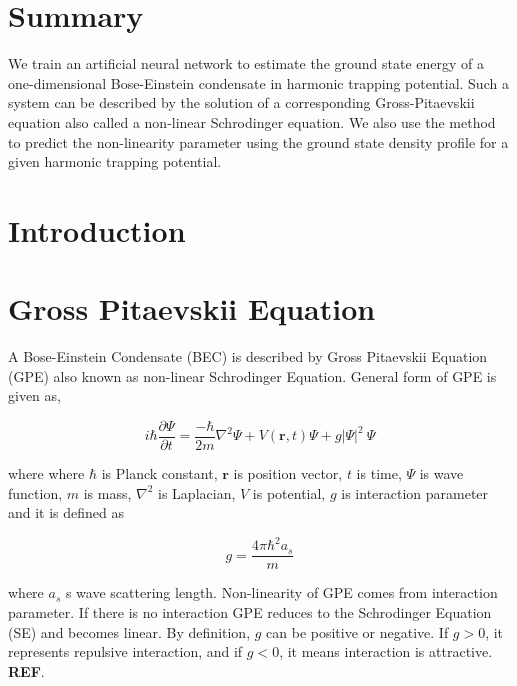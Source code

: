 \documentclass[a4paper,times,12pt]{article}
\begin{document}
\setcounter{page}{1}

\section*{Summary}

We train an artificial neural network to estimate the ground state energy
of a one-dimensional Bose-Einstein condensate in harmonic trapping potential.
Such a system can be described by the solution of a corresponding
Gross-Pitaevskii equation also called a non-linear Schrodinger equation.
We also use the method to predict the non-linearity parameter using the ground
state density profile for a given harmonic trapping potential.


\section{Introduction}
\section{Gross Pitaevskii Equation}

A Bose-Einstein Condensate (BEC) is described by Gross Pitaevskii Equation (GPE) also known as non-linear Schrodinger Equation. General form of GPE is given as,

\begin{equation}
\label{eq:GPE_3D}
i \hbar \frac {\partial \Psi}{\partial t} = \frac {-\hbar}{2m}\nabla^2
\Psi + V(\boldsymbol{r}, t)\Psi + g|\Psi|^2\ \Psi
\end{equation}


where %
where $\hbar$ is Planck constant, $\boldsymbol{r}$ is position vector, $t$ is time, $\Psi$ is wave function, $m$ is mass, $\nabla^2$ is Laplacian, $V$ is potential, $g$ is interaction parameter and it is defined as 

\begin{equation}
\label{eq:GPE_inter_param}
g=\frac{4\pi\hbar^2a_s}{m}
\end{equation}

where $a_s$ s wave scattering length. Non-linearity of GPE comes from interaction parameter. If there is no interaction GPE reduces to the Schrodinger Equation (SE) and becomes linear. By definition, $g$ can be positive or negative. If $g > 0$, it represents repulsive interaction, and if $g < 0$, it means interaction is attractive. \textbf{REF}. 
\end{document}
